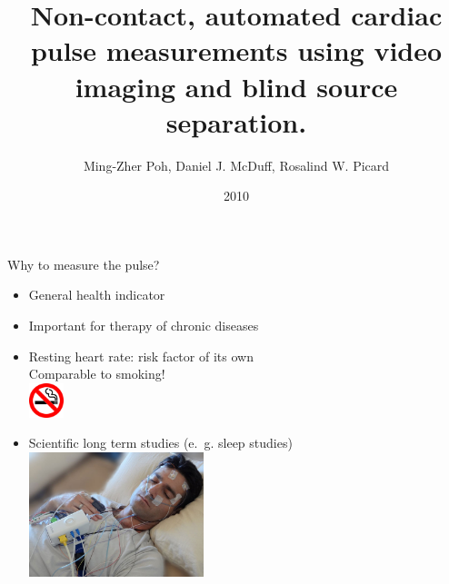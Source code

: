 \documentclass{beamer}
\title{Non-contact, automated cardiac pulse measurements using video imaging and blind source separation.}
\author{Ming-Zher Poh, Daniel J. McDuff, Rosalind W. Picard}
\date{2010}
\begin{document}
\newcommand{\mytitle}[1]{{\Large{\underline{#1}}}}
\newcommand{\positiveaspect}{\textcolor{green}{$\oplus$}}
\newcommand{\negativeaspect}{\textcolor{red}{$\ominus$}}


\begin{frame}{Why to measure the pulse?}
\begin{itemize}
	\item General health indicator \pause
	\item Important for therapy of chronic diseases \pause
	\item Resting heart rate: risk factor of its own\\ \pause
		Comparable to smoking!\\
		\includegraphics[width=1cm]{No_Smoking} \pause
	\item Scientific long term studies (e.~g. sleep studies)\\
		\includegraphics[width=0.4\textwidth]{Sleep-lab-facilities.jpg}
\end{itemize}
\end{frame}
\end{document}
